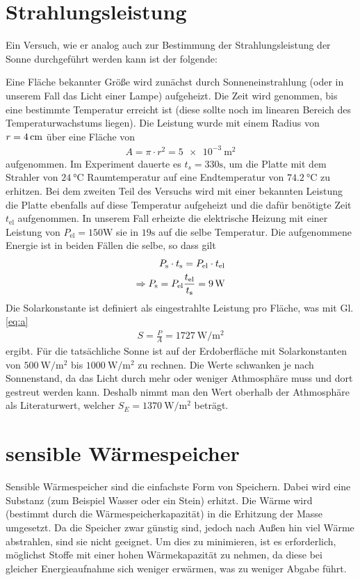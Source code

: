 \documentclass[12pt,a4paper,titlepage,headinclude,bibtotoc]{scrartcl}
\begin{document}
\section{Strahlungsleistung}
Ein Versuch, wie er analog auch zur Bestimmung der Strahlungsleistung der Sonne durchgeführt werden kann ist der folgende:

Eine Fläche bekannter Größe wird zunächst durch Sonneneinstrahlung (oder in unserem Fall das Licht einer Lampe) aufgeheizt.
Die Zeit wird genommen, bis eine bestimmte Temperatur erreicht ist (diese sollte noch im linearen Bereich des Temperaturwachstums liegen).
Die Leistung wurde mit einem Radius von $r=\SI4{\centi\meter}$ über eine Fläche von
\begin{align}
	A=\pi\cdot r^2=\SI{5e-3}{\meter\squared}\label{eq:a}
\end{align}
aufgenommen.
Im Experiment dauerte es $t_s=330\si\second$, um die Platte mit dem Strahler von $\SI{24}{\celsius}$ Raumtemperatur auf eine Endtemperatur von $\SI{74.2}{\celsius}$ zu erhitzen.
Bei dem zweiten Teil des Versuchs wird mit einer bekannten Leistung die Platte ebenfalls auf diese Temperatur aufgeheizt und die dafür benötigte Zeit $t_\text{el}$ aufgenommen.
In unserem Fall erheizte die elektrische Heizung mit einer Leistung von $P_\text{el}=150\si\watt$ sie in $19\si\second$ auf die selbe Temperatur.
Die aufgenommene Energie ist in beiden Fällen die selbe, so dass gilt
\begin{align*}
	P_\text s\cdot t_\text s=P_\text{el}\cdot t_\text{el}\\
	\Rightarrow P_\text s=P_\text{el}\frac{t_\text{el}}{t_\text s}=\SI9\watt
\end{align*}
Die Solarkonstante ist definiert als eingestrahlte Leistung pro Fläche, was mit Gl. \eqref{eq:a}
\begin{align*}
	S=\frac{P}{A}=\SI{1727}{\watt\per\meter\squared}
\end{align*}
ergibt.
Für die tatsächliche Sonne ist auf der Erdoberfläche mit Solarkonstanten von $\SI{500}{\watt\per\meter\squared}$ bis $\SI{1000}{\watt\per\meter\squared}$ zu rechnen.
Die Werte schwanken je nach Sonnenstand, da das Licht durch mehr oder weniger Athmosphäre muss und dort gestreut werden kann.
Deshalb nimmt man den Wert oberhalb der Athmosphäre als Literaturwert, welcher $S_E=\SI{1370}{\watt\per\meter\squared}$ beträgt.





\section{sensible Wärmespeicher}
Sensible Wärmespeicher sind die einfachste Form von Speichern.
Dabei wird eine Substanz (zum Beispiel Wasser oder ein Stein) erhitzt.
Die Wärme wird (bestimmt durch die Wärmespeicherkapazität) in die Erhitzung der Masse umgesetzt.
Da die Speicher zwar günstig sind, jedoch nach Außen hin viel Wärme abstrahlen, sind sie nicht geeignet.
Um dies zu minimieren, ist es erforderlich, möglichst Stoffe mit einer hohen Wärmekapazität zu nehmen, da diese bei gleicher Energieaufnahme sich weniger erwärmen, was zu weniger Abgabe führt.
\end{document}
